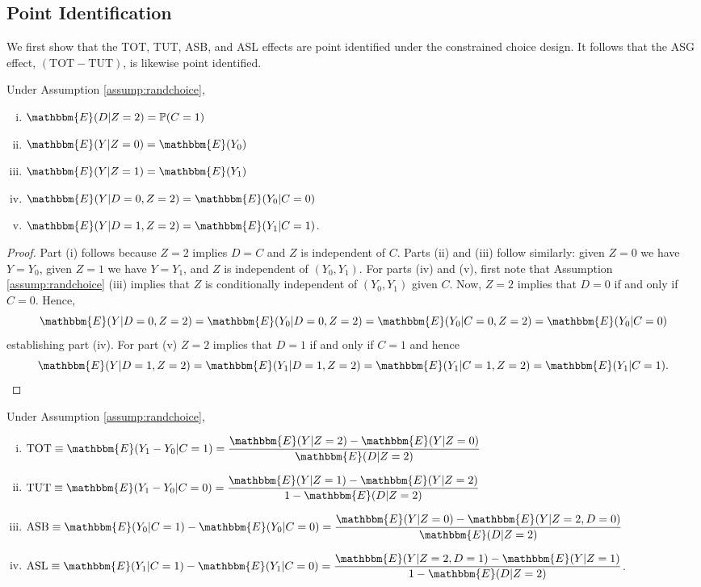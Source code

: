 \subsection{Point Identification}

We first show that the TOT, TUT, ASB, and ASL effects are point identified under the constrained choice design.
It follows that the ASG effect, $(\text{TOT} - \text{TUT})$, is likewise point identified. 

\begin{lem}
Under Assumption \ref{assump:randchoice},
\label{lem_randchoice}
   \begin{enumerate}[(i)]
       \item $\mathbbm{E}(D|Z=2) = \mathbb{P}(C=1)$
       \item $\mathbbm{E}(Y|Z=0) = \mathbbm{E}(Y_0)$
       \item $\mathbbm{E}(Y|Z=1) = \mathbbm{E}(Y_1)$
       \item $\mathbbm{E}(Y|D=0,Z=2) = \mathbbm{E}(Y_0|C=0)$
       \item $\mathbbm{E}(Y|D=1,Z=2) = \mathbbm{E}(Y_1|C=1)$.
   \end{enumerate} 
\end{lem}

\begin{proof}
Part (i) follows because $Z=2$ implies $D=C$ and $Z$ is independent of $C$.  
Parts (ii) and (iii) follow similarly: given $Z=0$ we have $Y = Y_0$, given $Z=1$ we have $Y = Y_1$, and $Z$ is independent of $(Y_0,Y_1)$.
For parts (iv) and (v), first note that Assumption \ref{assump:randchoice} (iii) implies that $Z$ is conditionally independent of $(Y_0,Y_1)$ given $C$.
Now, $Z=2$ implies that $D=0$ if and only if $C=0$. Hence,
\[
\mathbbm{E}(Y|D=0, Z=2) = \mathbbm{E}(Y_0|D=0, Z=2) = \mathbbm{E}(Y_0|C=0, Z=2)=\mathbbm{E}(Y_0|C=0)
\]
establishing part (iv).
For part (v) $Z=2$ implies that $D=1$ if and only if $C=1$ and hence
\[
\mathbbm{E}(Y|D=1, Z=2) = \mathbbm{E}(Y_1|D=1, Z=2) = \mathbbm{E}(Y_1|C=1, Z=2)= \mathbbm{E}(Y_1|C=1). %
\]
\end{proof}

\begin{prop} 
Under Assumption \ref{assump:randchoice},
    \begin{enumerate}[(i)]
        \item $\text{TOT} \equiv \mathbbm{E}(Y_1 - Y_0|C=1)  = \displaystyle \frac{\mathbbm{E}(Y|Z=2) - \mathbbm{E}(Y|Z=0)}{\mathbbm{E}(D|Z=2)}$
        \item $\text{TUT} \equiv \mathbbm{E}(Y_1 - Y_0|C=0) = \displaystyle \frac{\mathbbm{E}(Y|Z=1) - \mathbbm{E}(Y|Z=2)}{1 - \mathbbm{E}(D|Z=2)}$
        \item $\text{ASB} \equiv \mathbbm{E}(Y_0|C=1) - \mathbbm{E}(Y_0|C=0) = \displaystyle \frac{\mathbbm{E}(Y|Z=0) - \mathbbm{E}(Y|Z=2,D=0)}{\mathbbm{E}(D|Z=2)}$
        \item $\text{ASL} \equiv \mathbbm{E}(Y_1|C=1) - \mathbbm{E}(Y_1|C=0) = \displaystyle \frac{\mathbbm{E}(Y|Z=2,D=1) - \mathbbm{E}(Y|Z=1)}{1 - \mathbbm{E}(D|Z=2)}$.
    \end{enumerate}
\end{prop}

